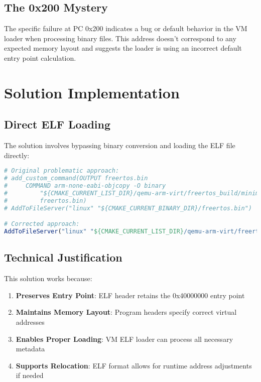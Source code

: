 \documentclass[11pt,a4paper]{article}
\begin{document}
\subsection{The 0x200 Mystery}

The specific failure at PC 0x200 indicates a bug or default behavior in the VM loader when processing binary files. This address doesn't correspond to any expected memory layout and suggests the loader is using an incorrect default entry point calculation.

\section{Solution Implementation}

\subsection{Direct ELF Loading}

The solution involves bypassing binary conversion and loading the ELF file directly:

\begin{lstlisting}[language=cmake, caption=Fixed CMakeLists.txt Configuration]
# Original problematic approach:
# add_custom_command(OUTPUT freertos.bin
#     COMMAND arm-none-eabi-objcopy -O binary 
#         "${CMAKE_CURRENT_LIST_DIR}/qemu-arm-virt/freertos_build/minimal_uart_virt.elf" 
#         freertos.bin)
# AddToFileServer("linux" "${CMAKE_CURRENT_BINARY_DIR}/freertos.bin")

# Corrected approach:
AddToFileServer("linux" "${CMAKE_CURRENT_LIST_DIR}/qemu-arm-virt/freertos_build/minimal_uart_virt.elf")
\end{lstlisting}

\subsection{Technical Justification}

This solution works because:

\begin{enumerate}
\item \textbf{Preserves Entry Point}: ELF header retains the 0x40000000 entry point
\item \textbf{Maintains Memory Layout}: Program headers specify correct virtual addresses
\item \textbf{Enables Proper Loading}: VM ELF loader can process all necessary metadata
\item \textbf{Supports Relocation}: ELF format allows for runtime address adjustments if needed
\end{enumerate}
\end{document}

